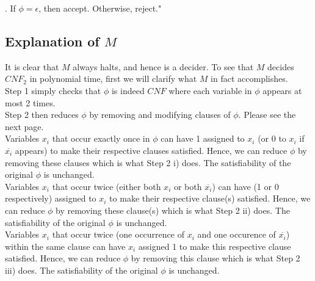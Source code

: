 \documentclass[12pt]{article}
\begin{document}
. If $\phi = \epsilon$, then accept. Otherwise, reject." 
\setlength\parindent{0pt}

\subsection*{Explanation of $M$}

It is clear that $M$ always halts, and hence is a decider. To see that $M$ decides $CNF_2$ in polynomial time, first we will clarify what $M$ in fact accomplishes. \\

Step 1 simply checks that $\phi$ is indeed $CNF$ where each variable in $\phi$ appears at most 2 times. \\

Step 2 then reduces $\phi$ by removing and modifying clauses of $\phi$. Please see the next page. \\

Variables $x_i$ that occur exactly once in $\phi$ can have 1 assigned to $x_i$ (or 0 to $x_i$ if $\overline{x_i}$ appears) to make their respective clauses satisfied. Hence, we can reduce $\phi$ by removing these clauses which is what Step 2 i) does. The satisfiability of the original $\phi$ is unchanged. \\

Variables $x_i$ that occur twice (either both $x_i$ or both $\overline{x_i}$) can have (1 or 0 respectively) assigned to $x_i$ to make their respective clause(s) satisfied. Hence, we can reduce $\phi$ by removing these clause(s) which is what Step 2 ii) does. The satisfiability of the original $\phi$ is unchanged. \\

Variables $x_i$ that occur twice (one occurrence of $x_i$ and one occurence of $\overline{x_i}$) within the same clause can have $x_i$ assigned 1 to make this respective clause satisfied. Hence, we can reduce $\phi$ by removing this clause which is what Step 2 iii) does. The satisfiability of the original $\phi$ is unchanged. \\
\end{document}
